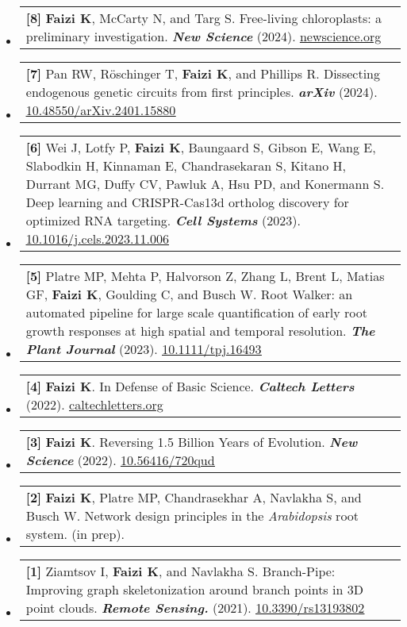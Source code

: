 \documentclass[letterpaper,11pt]{article}
\makeatletter
\newcommand{\pub}[5]{
  \item
  \begin{tabular*}{0.97\textwidth}[t]{@{}p{0.97\textwidth}@{}}
    \small#1 %
    \small#2 %
    \small\textbf{\emph{#3}} %
    \small(#4). %
    \small#5 %
  \end{tabular*}
  \vspace{-2pt}
}
\let\oldhref\href
\renewcommand{\href}[2]{\oldhref{#1}{\ul{#2}}}
\makeatother
\begin{document}
\begin{itemize}[leftmargin=0.15in, label={}]
  
  \pub{\textbf{[8]} \textbf{Faizi K}, McCarty N, and Targ S.}
  {Free-living chloroplasts: a preliminary investigation.}
  {New Science}
  {2024}
  {\href{https://research.newscience.org/2024/free-living-chloroplast/free-living-chloroplast}{newscience.org}}
  
  \pub{\textbf{[7]} Pan RW, Röschinger T, \textbf{Faizi K}, and Phillips R.}
  {Dissecting endogenous genetic circuits from first principles.}
  {arXiv}
  {2024}
  {\href{https://doi.org/10.48550/arXiv.2401.15880}{10.48550/arXiv.2401.15880}}

  \pub{\textbf{[6]} Wei J, Lotfy P, \textbf{Faizi K}, Baungaard S, Gibson E, Wang E, Slabodkin H, Kinnaman E, Chandrasekaran S, Kitano H, Durrant MG, Duffy CV, Pawluk A, Hsu PD, and Konermann S.}
  {Deep learning and CRISPR-Cas13d ortholog discovery for optimized RNA targeting.}
  {Cell Systems}
  {2023}
  {\href{https://doi.org/10.1016/j.cels.2023.11.006}{10.1016/j.cels.2023.11.006}}

  \pub{\textbf{[5]} Platre MP, Mehta P, Halvorson Z, Zhang L, Brent L, Matias GF, \textbf{Faizi K}, Goulding C, and Busch W.}
  {Root Walker: an automated pipeline for large scale quantification of early root growth responses at high spatial and temporal resolution.}
  {The Plant Journal}
  {2023}
  {\href{https://doi.org/10.1111/tpj.16493}{10.1111/tpj.16493}}

  \pub{\textbf{[4]} \textbf{Faizi K}.}
  {In Defense of Basic Science.}
  {Caltech Letters}
  {2022}
  {\href{https://caltechletters.org/viewpoints/in-defense-of-basic-science}{caltechletters.org}}

  \pub{\textbf{[3]} \textbf{Faizi K}.}
  {Reversing 1.5 Billion Years of Evolution.}
  {New Science}
  {2022}
  {\href{https://doi.org/10.56416/720qud}{10.56416/720qud}}

  \pub{\textbf{[2]} \textbf{Faizi K}, Platre MP, Chandrasekhar A, Navlakha S, and Busch W.}
  {Network design principles in the \emph{Arabidopsis} root system.}
  {}
  {in prep}
  {}

  \pub{\textbf{[1]} Ziamtsov I, \textbf{Faizi K}, and Navlakha S.}
  {Branch-Pipe: Improving graph skeletonization around branch points in 3D point clouds.}
  {Remote Sensing.}
  {2021}
  {\href{https://doi.org/10.3390/rs13193802}{10.3390/rs13193802}}
  
\end{itemize}
\end{document}
